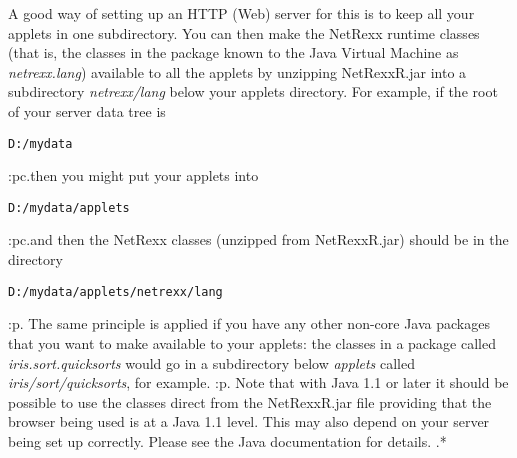 A good way of setting up an HTTP (Web) server for this is to keep all
your applets in one subdirectory.  You can then make the NetRexx runtime
classes (that is, the classes in the package known to the Java Virtual
Machine as \emph{netrexx.lang}) available to all the applets by
unzipping NetRexxR.jar into a subdirectory \emph{netrexx/lang} below
your applets directory.
\newline
For example, if the root of your server data tree is
\begin{verbatim}
D:/mydata
\end{verbatim}
:pc.then you might put your applets into
\begin{verbatim}
D:/mydata/applets
\end{verbatim}
:pc.and then the NetRexx classes (unzipped from NetRexxR.jar) should be in
the directory
\begin{verbatim}
D:/mydata/applets/netrexx/lang
\end{verbatim}
:p.
The same principle is applied if you have any other non-core Java
packages that you want to make available to your applets: the classes in
a package called \emph{iris.sort.quicksorts} would go in a subdirectory
below \emph{applets} called \emph{iris/sort/quicksorts}, for example.
:p.
Note that with Java 1.1 or later it should be possible to use the
classes direct from the NetRexxR.jar file providing that the browser
being used is at a Java 1.1 level.  This may also depend on your server
being set up correctly.  Please see the Java documentation for details.
.*
